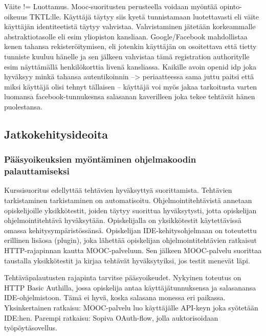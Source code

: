 \documentclass[finnish,gradu]{tktltiki}
\begin{document}
  Väite != Luottamus. Mooc-suoritusten perusteella voidaan myöntää opinto-oikeuus TKTL:lle. Käyttäjä täytyy siis kyetä tunnistamaan luotettavasti eli väite käyttäjän identiteetistä täytyy vahvistaa. Vahvistaminen jätetään korkeammalle abstraktiotasolle eli esim yliopiston kansliaan. Google/Facebook mahdollistaa kenen tahansa rekisteröitymisen, eli jotenkin käyttäjän on osoitettava että tietty tunniste kuuluu hänelle ja sen jälkeen vahvistaa tämä registration authoritylle esim näyttämällä henkilökorttia livenä kansliassa. Kaikille avoin openid idp joka hyväksyy minkä tahansa autentikoinnin --> periaatteessa sama juttu paitsi että miksi käyttäjä olisi tehnyt tällaisen -- käyttäjä voi myös jakaa tarkoitusta varten luomansa facebook-tunnukesnsa salasanan kaverilleen joka tekee tehtävät hänen puolestansa.

  \subsection{Jatkokehitysideoita} %
  \label{sub:jatkokehitysideoita}

  \subsubsection{Pääsyoikeuksien myöntäminen ohjelmakoodin palauttamiseksi} %
  \label{ssub:pääsyoikeuksien_myöntäminen_ohjelmakoodin_palauttamiseksi}

  Kurssisuoritus edellyttää tehtävien hyväksyttyä suorittamista. Tehtävien tarkistaminen tarkistaminen on automatisoitu. Ohjelmointitehtävistä annetaan opiskelijoille yksikkötestit, joiden täytyy suorittua hyväksytysti, jotta opiskelijan ohjelmointitehtävä hyväksytään. Opiskelijalla on yksikkötestit käytettävissä omassa kehitysympäristössänsä. Opiskelijan IDE-kehitysohjelmaan on toteutettu erillinen lisäosa (plugin), joka lähettää opiskelijan ohjelmointitehtävien ratkaisut HTTP-rajapinnan kautta MOOC-palveluun. Sen jälkeen MOOC-palvelu suorittaa taustalla yksikkötestit ja kirjaa tehtävät hyväksytyiksi, jos testit menevät läpi.

  Tehtäväpalautusten rajapinta tarvitse pääsyoikeudet. Nykyinen toteutus on HTTP Basic Authilla, jossa opiskelija antaa käyttäjätunnuksensa ja salasanansa IDE-ohjelmistoon. Tämä ei hyvä, koska salasana monessa eri paikassa. Yksinkertainen ratkaisu: MOOC-palvelu luo käyttäjälle API-keyn joka syötetään IDE:hen. Parempi ratkaisu: Sopiva OAuth-flow, jolla auktorisoidaan työpöytäsovellus.
\end{document}
